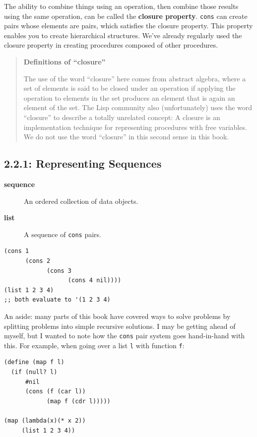 \documentclass[final,fleqn,titlepage,twoside]{article}
\begin{document}
The ability to combine things using an operation, then combine those results
using the same operation, can be called the \textbf{closure property}. \texttt{cons} can
create pairs whose elements are pairs, which satisfies the closure property.
This property enables you to create hierarchical structures. We've already
regularly used the closure property in creating procedures composed of other
procedures.

\begin{quote}
\textbf{Definitions of ``closure''}

The use of the word ``closure'' here comes from abstract algebra, where a set of
elements is said to be closed under an operation if applying the operation to
elements in the set produces an element that is again an element of the set.
The Lisp community also (unfortunately) uses the word ``closure'' to describe a
totally unrelated concept: A closure is an implementation technique for
representing procedures with free variables. We do not use the word ``closure''
in this second sense in this book.
\end{quote}

\subsection{2.2.1: Representing Sequences}
\label{sec:org91e559d}
\begin{description}
\item[{\textbf{sequence}}] An ordered collection of data objects.
\item[{\textbf{list}}] A sequence of \texttt{cons} pairs.
\end{description}

\begin{verbatim}
(cons 1
      (cons 2
            (cons 3
                  (cons 4 nil))))
(list 1 2 3 4)
;; both evaluate to '(1 2 3 4)
\end{verbatim}


An aside: many parts of this book have covered ways to solve problems by
splitting problems into simple recursive solutions. I may be getting ahead of
myself, but I wanted to note how the \texttt{cons} pair system goes
hand-in-hand with this. For example, when going over a list \texttt{l} with
function \texttt{f}:
\begin{verbatim}
(define (map f l)
  (if (null? l)
      #nil
      (cons (f (car l))
            (map f (cdr l)))))

(map (lambda(x)(* x 2))
     (list 1 2 3 4))
\end{verbatim}
\end{document}
